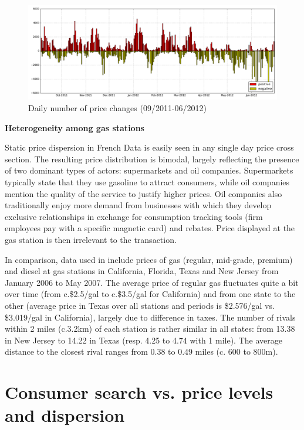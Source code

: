 \documentclass[11pt]{article}
\begin{document}
\begin{figure}[!h]
    \caption{Daily number of price changes (09/2011-06/2012)}
	\centering
		\includegraphics[width=16cm]{graphs/diesel_nb_price_chges.png}
\end{figure}


\textbf{Heterogeneity among gas stations}

Static price dispersion in French Data is easily seen in any single day price cross section. The resulting price distribution is bimodal, largely reflecting the presence of two dominant types of actors: supermarkets and oil companies. Supermarkets typically state that they use gasoline to attract consumers, while oil companies mention the quality of the service to justify higher prices. Oil companies also traditionally enjoy more demand from businesses with which they develop exclusive relationships in exchange for consumption tracking tools (firm employees pay with a specific magnetic card) and rebates. Price displayed at the gas station is then irrelevant to the transaction.

In comparison, data used in \cite{TAP11} include prices of gas (regular, mid-grade, premium) and diesel at gas stations in California, Florida, Texas and New Jersey from January 2006 to May 2007. The average price of regular gas fluctuates quite a bit over time (from c.\$2.5/gal to c.\$3.5/gal for California) and from one state to the other (average price in Texas over all stations and periods is \$2.576/gal vs. \$3.019/gal in California), largely due to difference in taxes. The number of rivals within 2 miles (c.3.2km) of each station is rather similar in all states: from 13.38 in New Jersey to 14.22 in Texas (resp. 4.25 to 4.74 with 1 mile). The average distance to the closest rival ranges from 0.38 to 0.49 miles (c. 600 to 800m).

\section{Consumer search vs. price levels and dispersion}
\end{document}
